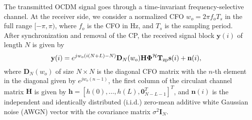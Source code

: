 \documentclass[journal]{IEEEtran}
\begin{document}
The transmitted OCDM signal goes through a time-invariant frequency-selective channel. At the receiver side, we consider a normalized CFO \(w_o = 2\pi f_oT_s\) in the full range \([-\pi,\pi)\), where \(f_o\) is the CFO in Hz, and $T_s$ is the sampling period. After synchronization and removal of the CP, the received signal block $\mathbf{y}(i)$ of length $N$ is given by %
\begin{equation} \label{4}
    \mathbf{y}(i)=e^{j w_o(i(N+L)-N)}\mathbf{D}_N(w_o)\mathbf{H} \mathbf{\Phi}^\mathcal{H}\mathbf{T}_{\rm zp}\mathbf{s}(i)+\mathbf{n}(i),
\end{equation}
where \(\mathbf{D}_N(w_o)\) of size \(N \times N\) is the diagonal CFO matrix with the \(n\)-th element in the diagonal given by \(e^{jw_o(n-1)}\), the first column of the circulant channel matrix \(\mathbf{H}\) is given by $\mathbf{h} = [h(0),\dots,h(L), \mathbf{0}_{N-L-1}^{T}]^{T}$, and \(\mathbf{n}(i)\) is the independent and identically distributed (i.i.d.) zero-mean additive white Gaussian noise (AWGN) vector with the covariance matrix $\sigma^2 \mathbf{I}_N$. 

\end{document}
